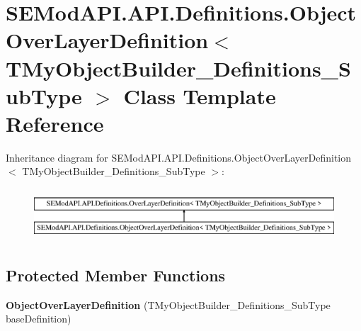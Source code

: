 \hypertarget{class_s_e_mod_a_p_i_1_1_a_p_i_1_1_definitions_1_1_object_over_layer_definition}{}\section{S\+E\+Mod\+A\+P\+I.\+A\+P\+I.\+Definitions.\+Object\+Over\+Layer\+Definition$<$ T\+My\+Object\+Builder\+\_\+\+Definitions\+\_\+\+Sub\+Type $>$ Class Template Reference}
\label{class_s_e_mod_a_p_i_1_1_a_p_i_1_1_definitions_1_1_object_over_layer_definition}
Inheritance diagram for S\+E\+Mod\+A\+P\+I.\+A\+P\+I.\+Definitions.\+Object\+Over\+Layer\+Definition$<$ T\+My\+Object\+Builder\+\_\+\+Definitions\+\_\+\+Sub\+Type $>$\+:\begin{figure}[H]
\begin{center}
\leavevmode
\includegraphics[height=1.954625cm]{class_s_e_mod_a_p_i_1_1_a_p_i_1_1_definitions_1_1_object_over_layer_definition}
\end{center}
\end{figure}
\subsection*{Protected Member Functions}
\begin{DoxyCompactItemize}
\item 
\hypertarget{class_s_e_mod_a_p_i_1_1_a_p_i_1_1_definitions_1_1_object_over_layer_definition_a14689763ffcafee4ccdd8df6005c50e6}{}{\bfseries Object\+Over\+Layer\+Definition} (T\+My\+Object\+Builder\+\_\+\+Definitions\+\_\+\+Sub\+Type base\+Definition)\label{class_s_e_mod_a_p_i_1_1_a_p_i_1_1_definitions_1_1_object_over_layer_definition_a14689763ffcafee4ccdd8df6005c50e6}

\end{DoxyCompactItemize}
